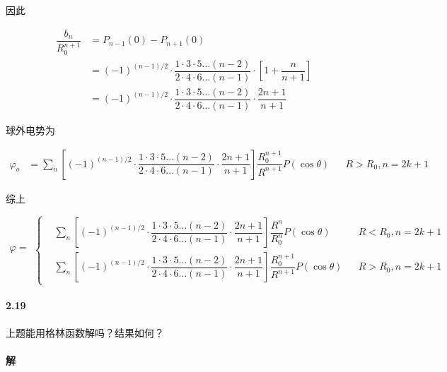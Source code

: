 \documentclass{article}
\begin{document}
因此

\begin{equation*}
  \begin{aligned}
    \dfrac{b_n}{R_0^{n+1}}  &=
    P_{n-1} \left( 0 \right) - P_{n+1} \left( 0 \right) \\
    &= \left( -1  \right)^{\left( n-1 \right)/ 2} \cdot \dfrac{1 \cdot 3 \cdot 5 \dots \left( n-2 \right)}{2 \cdot 4 \cdot 6 \dots \left( n-1 \right)} \cdot \left[ 1 + \dfrac{n}{n+1}  \right] \\
    &= \left( -1  \right)^{\left( n-1 \right)/ 2} \cdot \dfrac{1 \cdot 3 \cdot 5 \dots \left( n-2 \right)}{2 \cdot 4 \cdot 6 \dots \left( n-1 \right)} \cdot \dfrac{2n+1}{n+1}
  \end{aligned}
\end{equation*}

球外电势为

\begin{equation*}
  \begin{aligned}
    \varphi_o &= \sum_n \left[ \left( -1  \right)^{\left( n-1 \right)/ 2} \cdot \dfrac{1 \cdot 3 \cdot 5 \dots \left( n-2 \right)}{2 \cdot 4 \cdot 6 \dots \left( n-1 \right)} \cdot \dfrac{2n+1}{n+1}
 \right] \dfrac{R_0^{n+1}}{R^{n+1}}  P \left( \cos \theta \right) && R>R_0, n=2k+1
  \end{aligned}
\end{equation*}

综上

\begin{equation*}
  \begin{aligned}
    \varphi = 
  \end{aligned}
  \left\{
  \begin{aligned}
    &\sum_n \left[ \left( -1  \right)^{\left( n-1 \right)/ 2} \cdot \dfrac{1 \cdot 3 \cdot 5 \dots \left( n-2 \right)}{2 \cdot 4 \cdot 6 \dots \left( n-1 \right)} \cdot \dfrac{2n+1}{n+1}
 \right] \dfrac{R^n}{R_0^n}  P \left( \cos \theta \right) && R<R_0, n=2k+1 \\
    &\sum_n \left[ \left( -1  \right)^{\left( n-1 \right)/ 2} \cdot \dfrac{1 \cdot 3 \cdot 5 \dots \left( n-2 \right)}{2 \cdot 4 \cdot 6 \dots \left( n-1 \right)} \cdot \dfrac{2n+1}{n+1}
 \right] \dfrac{R_0^{n+1}}{R^{n+1}}  P \left( \cos \theta \right) && R>R_0, n=2k+1
  \end{aligned}
  \right.
\end{equation*}

\paragraph{2.19}

上题能用格林函数解吗？结果如何？

\paragraph{解}
\end{document}
